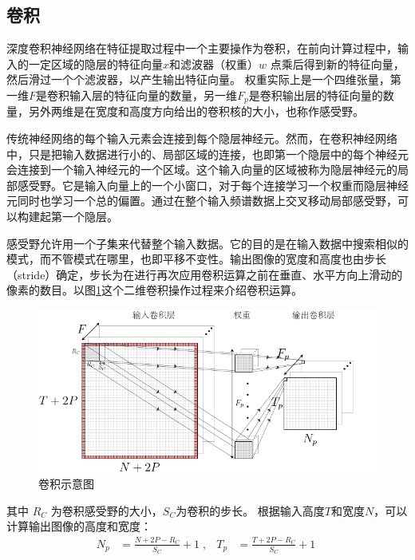 \subsection{卷积}

深度卷积神经网络在特征提取过程中一个主要操作为卷积，在前向计算过程中，输入的一定区域的隐层的特征向量$x$和滤波器（权重）$w$ 点乘后得到新的特征向量，然后滑过一个个滤波器，以产生输出特征向量。
权重实际上是一个四维张量，第一维$ F $是卷积输入层的特征向量的数量，另一维$ F_p $是卷积输出层的特征向量的数量，另外两维是在宽度和高度方向给出的卷积核的大小，也称作感受野。

传统神经网络的每个输入元素会连接到每个隐层神经元。然而，在卷积神经网络中，只是把输入数据进行小的、局部区域的连接，也即第一个隐层中的每个神经元会连接到一个输入神经元的一个区域。这个输入向量的区域被称为隐层神经元的局部感受野。它是输入向量上的一个小窗口，对于每个连接学习一个权重而隐层神经元同时也学习一个总的偏置。通过在整个输入频谱数据上交叉移动局部感受野，可以构建起第一个隐层。

感受野允许用一个子集来代替整个输入数据。它的目的是在输入数据中搜索相似的模式，而不管模式在哪里，也即平移不变性。输出图像的宽度和高度也由步长（stride）确定，步长为在进行再次应用卷积运算之前在垂直、水平方向上滑动的像素的数目。以图\ref{fig:conv}这个二维卷积操作过程来介绍卷积运算。

\begin{figure}[hbt]
	\centering
  \includegraphics[width=13.5cm]{figures/networks/conv}
	\caption{卷积示意图}
	\label{fig:conv}
\end{figure}

其中 $R_C$ 为卷积感受野的大小，$S_C$为卷积的步长。
根据输入高度$ T $和宽度$ N $，可以计算输出图像的高度和宽度：
\begin{align}
  N_p&=\frac{N+2P-R_C}{S_C}+1 \;,&
  T_p&=\frac{T+2P-R_C}{S_C}+1\;
\end{align}

